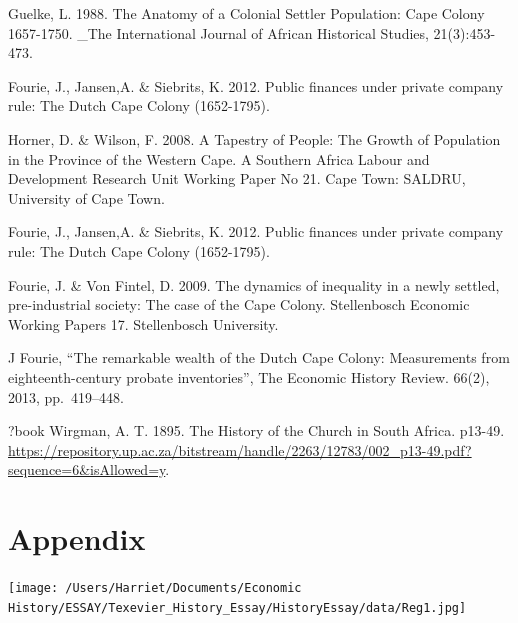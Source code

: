 \documentclass[11pt,preprint, authoryear]{elsarticle}
\let\origfigure\figure
\let\endorigfigure\endfigure
\renewenvironment{figure}[1][2] {
    \expandafter\origfigure\expandafter[H]
} {
    \endorigfigure
}
\numberwithin{equation}{section}
\numberwithin{figure}{section}
\numberwithin{table}{section}
\newlength{\cslhangindent}
\newenvironment{CSLReferences}%
  {\setlength{\parindent}{0pt}%
  \everypar{\setlength{\hangindent}{\cslhangindent}}\ignorespaces}%
  {\par}
\begin{document}
Guelke, L. 1988. The Anatomy of a Colonial Settler Population: Cape
Colony 1657-1750. \_The International Journal of African Historical
Studies, 21(3):453-473.

Fourie, J., Jansen,A. \& Siebrits, K. 2012. Public finances under
private company rule: The Dutch Cape Colony (1652-1795).

Horner, D. \& Wilson, F. 2008. A Tapestry of People: The Growth of
Population in the Province of the Western Cape. A Southern Africa Labour
and Development Research Unit Working Paper No 21. Cape Town: SALDRU,
University of Cape Town.

Fourie, J., Jansen,A. \& Siebrits, K. 2012. Public finances under
private company rule: The Dutch Cape Colony (1652-1795).

Fourie, J. \& Von Fintel, D. 2009. The dynamics of inequality in a newly
settled, pre-industrial society: The case of the Cape Colony.
Stellenbosch Economic Working Papers 17. Stellenbosch University.

J Fourie, ``The remarkable wealth of the Dutch Cape Colony: Measurements
from eighteenth-century probate inventories'', The Economic History
Review. 66(2), 2013, pp.~419--448.

?book Wirgman, A. T. 1895. The History of the Church in South Africa.
p13-49.
\url{https://repository.up.ac.za/bitstream/handle/2263/12783/002_p13-49.pdf?sequence=6\&isAllowed=y}.

\hypertarget{refs}{}
\begin{CSLReferences}{0}{0}
\end{CSLReferences}

\hypertarget{appendix}{%
\section*{Appendix}\label{appendix}}

\begin{figure}
\centering
\texttt{[image: /Users/Harriet/Documents/Economic History/ESSAY/Texevier\_History\_Essay/HistoryEssay/data/Reg1.jpg]}
\caption{Alt Text}
\end{figure}


\end{document}
